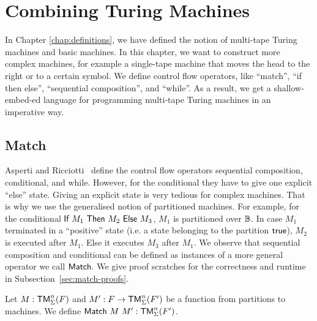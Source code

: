 \chapter{Combining Turing Machines}
\label{chap:combining}

In Chapter \ref{chap:definitions}, we have defined the notion of multi-tape Turing machines and basic machines.  In this chapter, we want to construct
more complex machines, for example a single-tape machine that moves the head to the right or to a certain symbol.
We define control flow operators, like ``match'', ``if then else'', ``sequential composition'', and ``while''.
As a result, we get a shallow-embed-ed language for programming multi-tape Turing machines in an imperative way.

\section{Match}
\label{sec:match}

Asperti and Ricciotti~\cite{asperti2015} define the control flow operators sequential composition, conditional, and while.  However, for the
conditional they have to give one explicit ``else'' state.  Giving an explicit state is very tedious for complex machines.  That is why we use the
generalised notion of partitioned machines.  For example, for the conditional $\textsf{If}~M_1~\textsf{Then}~M_2~\textsf{Else}~M_3$, $M_1$ is partitioned over $\mathbb{B}$.  In case $M_1$
terminated in a ``positive'' state (i.e. a state belonging to the partition $\textsf{true}$), $M_2$ is executed after $M_1$.  Else it executes $M_3$ after
$M_1$.  We observe that sequential composition and conditional can be defined as instances of a more general operator we call $\textsf{Match}$.  We give
proof scratches for the correctness and runtime in Subsection~\ref{sec:match-proofs}.

Let $M : \textsf{TM}_\Sigma^n(F)$ and $M' : F \rightarrow \textsf{TM}_\Sigma^n(F')$ be a function from partitions to machines.  We define
$\textsf{Match}~M~M' : \textsf{TM}_\Sigma^n(F')$.

